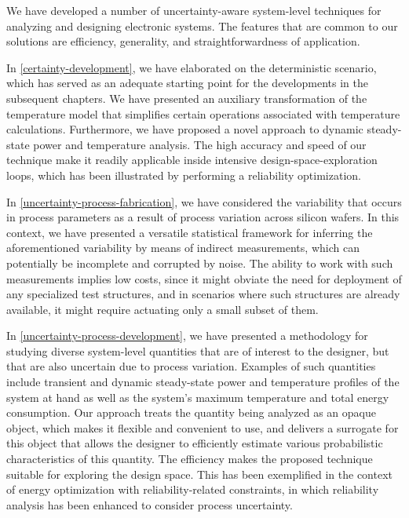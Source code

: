 We have developed a number of uncertainty-aware system-level techniques for
analyzing and designing electronic systems. The features that are common to our
solutions are efficiency, generality, and straightforwardness of application.

In \cref{certainty-development}, we have elaborated on the deterministic
scenario, which has served as an adequate starting point for the developments in
the subsequent chapters. We have presented an auxiliary transformation of the
temperature model that simplifies certain operations associated with temperature
calculations. Furthermore, we have proposed a novel approach to dynamic
steady-state power and temperature analysis. The high accuracy and speed of our
technique make it readily applicable inside intensive design-space-exploration
loops, which has been illustrated by performing a reliability optimization.

In \cref{uncertainty-process-fabrication}, we have considered the variability
that occurs in process parameters as a result of process variation across
silicon wafers. In this context, we have presented a versatile statistical
framework for inferring the aforementioned variability by means of indirect
measurements, which can potentially be incomplete and corrupted by noise. The
ability to work with such measurements implies low costs, since it might obviate
the need for deployment of any specialized test structures, and in scenarios
where such structures are already available, it might require actuating only a
small subset of them.

In \cref{uncertainty-process-development}, we have presented a methodology for
studying diverse system-level quantities that are of interest to the designer,
but that are also uncertain due to process variation. Examples of such
quantities include transient and dynamic steady-state power and temperature
profiles of the system at hand as well as the system's maximum temperature and
total energy consumption. Our approach treats the quantity being analyzed as an
opaque object, which makes it flexible and convenient to use, and delivers a
surrogate for this object that allows the designer to efficiently estimate
various probabilistic characteristics of this quantity. The efficiency makes the
proposed technique suitable for exploring the design space. This has been
exemplified in the context of energy optimization with reliability-related
constraints, in which reliability analysis has been enhanced to consider process
uncertainty.

